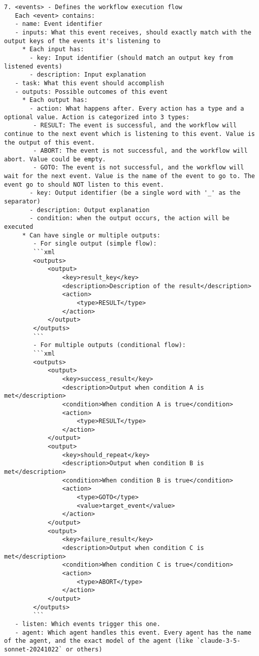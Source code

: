 \begin{lstlisting}
7. <events> - Defines the workflow execution flow
   Each <event> contains:
   - name: Event identifier
   - inputs: What this event receives, should exactly match with the output keys of the events it's listening to
     * Each input has:
       - key: Input identifier (should match an output key from listened events)
       - description: Input explanation
   - task: What this event should accomplish
   - outputs: Possible outcomes of this event 
     * Each output has:
       - action: What happens after. Every action has a type and a optional value. Action is categorized into 3 types:
        - RESULT: The event is successful, and the workflow will continue to the next event which is listening to this event. Value is the output of this event.
        - ABORT: The event is not successful, and the workflow will abort. Value could be empty.
        - GOTO: The event is not successful, and the workflow will wait for the next event. Value is the name of the event to go to. The event go to should NOT listen to this event.
       - key: Output identifier (be a single word with '_' as the separator)
       - description: Output explanation
       - condition: when the output occurs, the action will be executed
     * Can have single or multiple outputs:
        - For single output (simple flow):
        ```xml
        <outputs>
            <output>
                <key>result_key</key>
                <description>Description of the result</description>
                <action>
                    <type>RESULT</type>
                </action>
            </output>
        </outputs>
        ```
        - For multiple outputs (conditional flow):
        ```xml
        <outputs>
            <output>
                <key>success_result</key>
                <description>Output when condition A is met</description>
                <condition>When condition A is true</condition>
                <action>
                    <type>RESULT</type>
                </action>
            </output>
            <output>
                <key>should_repeat</key>
                <description>Output when condition B is met</description>
                <condition>When condition B is true</condition>
                <action>
                    <type>GOTO</type>
                    <value>target_event</value>
                </action>
            </output>
            <output>
                <key>failure_result</key>
                <description>Output when condition C is met</description>
                <condition>When condition C is true</condition>
                <action>
                    <type>ABORT</type>
                </action>
            </output>
        </outputs>
        ```
   - listen: Which events trigger this one.
   - agent: Which agent handles this event. Every agent has the name of the agent, and the exact model of the agent (like `claude-3-5-sonnet-20241022` or others)



\end{lstlisting}
